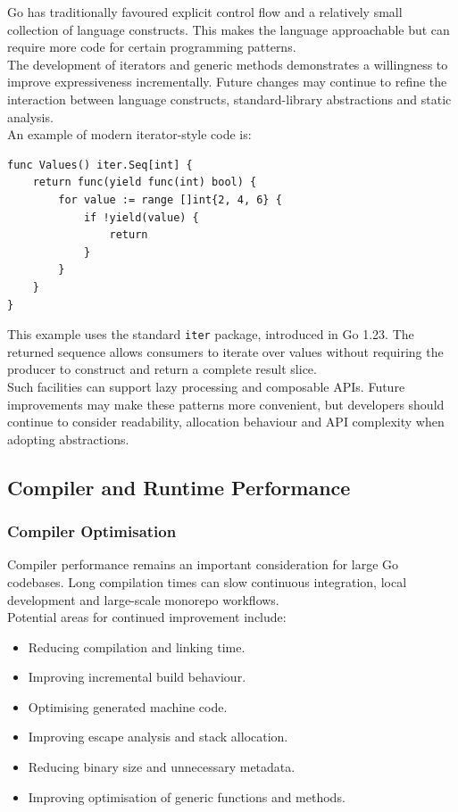 Go has traditionally favoured explicit control flow and a relatively small collection of language constructs. This makes the language approachable but can require more code for certain programming patterns.\\

The development of iterators and generic methods demonstrates a willingness to improve expressiveness incrementally. Future changes may continue to refine the interaction between language constructs, standard-library abstractions and static analysis.\\

An example of modern iterator-style code is:

\begin{lstlisting}
func Values() iter.Seq[int] {
    return func(yield func(int) bool) {
        for value := range []int{2, 4, 6} {
            if !yield(value) {
                return
            }
        }
    }
}
\end{lstlisting}

This example uses the standard \texttt{iter} package, introduced in Go 1.23. The returned sequence allows consumers to iterate over values without requiring the producer to construct and return a complete result slice.\\

Such facilities can support lazy processing and composable APIs. Future improvements may make these patterns more convenient, but developers should continue to consider readability, allocation behaviour and API complexity when adopting abstractions.

\subsection{Compiler and Runtime Performance}

\subsubsection{Compiler Optimisation}

Compiler performance remains an important consideration for large Go codebases. Long compilation times can slow continuous integration, local development and large-scale monorepo workflows.\\

Potential areas for continued improvement include:

\begin{itemize}
    \item Reducing compilation and linking time.
    \item Improving incremental build behaviour.
    \item Optimising generated machine code.
    \item Improving escape analysis and stack allocation.
    \item Reducing binary size and unnecessary metadata.
    \item Improving optimisation of generic functions and methods.
\end{itemize}

